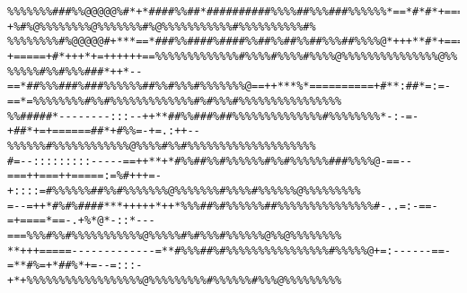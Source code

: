 \documentclass[a4paper, 12pt, oneside]{article}
\begin{document}
\begin{verbatim}
%%%%%%%###%%@@@@@%#*+*####%%##*##########%%%%##%%%###%%%%%%*==*#*#*+==========+*%#*#*+#*++=:+-+%#%@%%%%%%%%@%%%%%%%#%@%%%%%%%%%%%#%%%%%%%%%%#%
%%%%%%%%#%@@@@@#+***==*###%%####%####%%##%%##%%##%%%##%%%%@*+++**#*+===-+=====+#*+++*+=++++++==%%%%%%%%%%%%%#%%%%#%%%%#%%%%@%%%%%%%%%%%%%%%@%%
%%%%%#%%#%%%###*++*--==*##%%%###%###%%%%%%##%%#%%%#%%%%%%%@==++***%*==========+#**:##*=:=-==*=%%%%%%%%#%%#%%%%%%%%%%%%%#%#%%%#%%%%%%%%%%%%%%%%
%%#####*--------:::--++**##%%###%##%%%%%%%%%%%%%%#%%%%%%%%*-:-=-+##*+=+======##*+#%%=-+=.:++--%%%%%%#%%%%%%%%%%%%@%%%%#%%#%%%%%%%%%%%%%%%%%%%%
#=--:::::::::-----==++**+*#%%##%%#%%%%%%#%%#%%%%%%###%%%%@-==--===++===++=====:=%#+++=-+::::=#%%%%%%##%%#%%%%%%%@%%%%%%%#%%%%#%%%%%%@%%%%%%%%%
=--=++*#%#%####***+++++*++*%%%##%#%%%%%%##%%%%%%%%%%%%%%%#-..=:-==-=+====*==-.+%*@*-::*---===%%%#%%#%%%%%%%%%%%@%%%%%#%#%%%#%%%%%%@%%@%%%%%%%%
**+++=====-------------=**#%%%##%#%%%%%%%%%%%%%%%%#%%%%%@+=:------==-=**#%=+*##%*+=--=:::-+*+%%%%%%%%%%%%%%%%%%@%%%%%%%%%#%%%%%%#%%%@%%%%%%%%%    
\end{verbatim}

\end{document}
